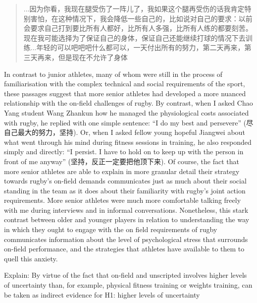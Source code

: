 \begin{CJK}{UTF8}{gbsn}
\begin{quote}
      ...因为你看，我现在腿受伤了一阵儿了，我如果这个腿再受伤的话我肯定特别害怕，在这种情况下，我会降低一些自己的，比如说对自己的要求：以前会要求自己打到要比所有人都好，比所有人多强，比所有人练的都要刻苦。现在我可能选择为了保证自己的身体，保证自己还能继续打球的情况下去训练...年轻的可以吧吧吧什么都可以，一天付出所有的努力，第二天再来，第三天再来，但是现在不允许了身体
\end{quote}

In contrast to junior athletes, many of whom were still in the process of familiarisation with the complex technical and social requirements of the sport, these passages suggest that more senior athletes had developed a more nuanced relationship with the on-field challenges of rugby.  By contrast, when I asked Chao Yang student Wang Zhankun how he managed the physiological costs associated with rugby, he replied with one simple sentence: ``I do my best and persevere'' (尽自己最大的努力，坚持).  Or, when I asked fellow young hopeful Jiangwei about what went through his mind during fitness sessions in training, he also responded simply and directly: ``I persist. I have to hold on to keep up with the person in front of me anyway'' (坚持，反正一定要把他顶下来).  Of course, the fact that more senior athletes are able to explain in more granular detail their strategy towards rugby’s on-field demands communicates just as much about their social standing in the team as it does about their familiarity with rugby’s joint action requirements.  More senior athletes were much more comfortable talking freely with me during interviews and in informal conversations.  Nonetheless, this stark contrast between older and younger players in relation to understanding the way in which they ought to engage with the on field requirements of rugby communicates information about the level of psychological stress that surrounds on-field performance, and the strategies that athletes have available to them to quell this anxiety.





Explain:
By virtue of the fact that on-field and unscripted involves higher levels of uncertainty than, for example, physical fitness training or weights training, can be taken as indirect evidence for H1: higher levels of uncertainty


\end{CJK}
